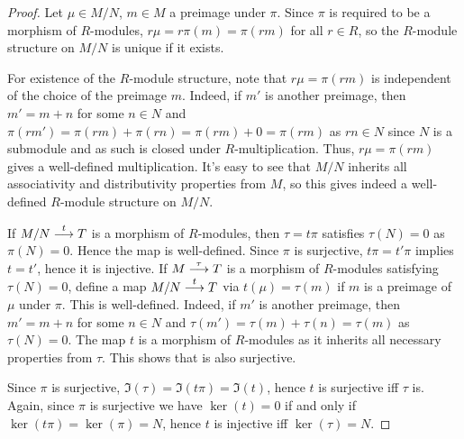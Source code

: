 \documentclass[a4paper,parskip=half,numbers=enddot, DIV=12]{scrreprt}
\begin{document}
	\begin{proof}
		Let $\mu\in M/N$, $m\in M$ a preimage under $\pi$. Since $\pi$ is required to be a morphism of $R$-modules, $r\mu=r\pi(m)=\pi(rm)$ for all $r\in R$, so the $R$-module structure on $M/N$ is unique if it exists.
		
		For existence of the $R$-module structure, note that $r\mu=\pi(rm)$ is independent of the choice of the preimage $m$. Indeed, if $m'$ is another preimage, then $m'=m+n$ for some $n\in N$ and $\pi(rm')=\pi(rm)+\pi(rn)=\pi(rm)+0=\pi(rm)$ as $rn\in N$ since $N$ is a submodule and as such is closed under $R$-multiplication. Thus, $r\mu=\pi(rm)$ gives a well-defined multiplication. It's easy to see that $M/N$ inherits all associativity and distributivity properties from $M$, so this gives indeed a well-defined $R$-module structure on $M/N$.
		
		If $M/N\morphism[t]T$ is a morphism of $R$-modules, then $\tau=t\pi$ satisfies $\tau(N)=0$ as $\pi(N)=0$. Hence the map  is well-defined. Since $\pi$ is surjective, $t\pi=t'\pi$ implies $t=t'$, hence it is injective. If $M\morphism[\tau]T$ is a morphism of $R$-modules satisfying $\tau(N)=0$, define a map $M/N\morphism[t]T$ via $t(\mu)=\tau(m)$ if $m$ is a preimage of $\mu$ under $\pi$. This is well-defined. Indeed, if $m'$ is another preimage, then $m'=m+n$ for some $n\in N$ and $\tau(m')=\tau(m)+\tau(n)=\tau(m)$ as $\tau(N)=0$. The map $t$ is a morphism of $R$-modules as it inherits all necessary properties from $\tau$. This shows that  is also surjective.
		
		Since $\pi$ is surjective, $\Im(\tau)=\Im(t\pi)=\Im(t)$, hence $t$ is surjective iff $\tau$ is. Again, since $\pi$ is surjective we have $\ker(t)=0$ if and only if $\ker(t\pi)=\ker(\pi)=N$, hence $t$ is injective iff $\ker(\tau)=N$.
	\end{proof}
\end{document}
